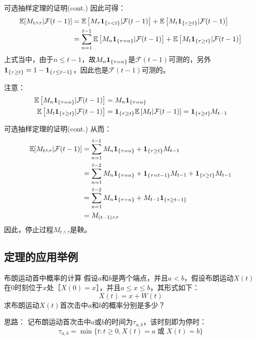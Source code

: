 \documentclass[t]{beamer}
\newcommand{\E}{\mathbb{E}}
\begin{document}
       \begin{frame}{可选抽样定理的证明(cont.)}
        因此可得：
        \[\begin{split}
        \E[M_{t\wedge \tau}|\mathcal{F}(t-1)]&=\E\left[M_{\tau}{\bf 1}_{\{\tau<t\}}|\mathcal{F}(t-1)\right]+\E\left[M_{t}{\bf 1}_{\{\tau\ge t\}}|\mathcal{F}(t-1)\right]\\
        &=\sum^{t-1}_{n=1}\E\left[M_{n} {\bf 1}_{\{\tau=n\}} |\mathcal{F}(t-1)\right] + \E\left[M_{t}{\bf 1}_{\{\tau\ge t\}}|\mathcal{F}(t-1)\right]
        \end{split} \]
        上式当中，由于$n\le t-1$，故$M_{n} {\bf 1}_{\{\tau=n\}}$是$\mathcal{F}(t-1)$可测的，另外${\bf 1}_{\{\tau\ge t\}}=1-{\bf 1}_{\{\tau\le t-1\}}$，因此也是$\mathcal{F}(t-1)$可测的。
        \begin{block}{注意：}
          \[\begin{split}
            \E\left[M_{n} {\bf 1}_{\{\tau=n\}} |\mathcal{F}(t-1)\right]&=M_{n}{\bf 1}_{\{\tau=n\}}\\
          \E\left[M_{t}{\bf 1}_{\{\tau\ge t\}}|\mathcal{F}(t-1)\right]&={\bf 1}_{\{\tau\ge t\}}\E\left[M_{t}|\mathcal{F}(t-1)\right] ={\bf 1}_{\{\tau\ge t\}}M_{t-1}
          \end{split}\]
        \end{block}
      \end{frame}

      \begin{frame}{可选抽样定理的证明(cont.)}
        从而：
        \[\begin{split}
        \E[M_{t\wedge \tau}|\mathcal{F}(t-1)]
        &=\sum^{t-1}_{n=1}M_{n}{\bf 1}_{\{\tau=n\}}+{\bf 1}_{\{\tau\ge t\}}M_{t-1}\\
        &=\sum^{t-2}_{n=1}M_{n}{\bf 1}_{\{\tau=n\}}+{\bf 1}_{\{\tau= t-1\}}M_{t-1}+{\bf 1}_{\{\tau\ge t\}}M_{t-1}\\
        &=\sum^{t-2}_{n=1}M_{n}{\bf 1}_{\{\tau=n\}}+M_{t-1}{\bf 1}_{\{\tau\ge t-1\}}\\
        &=M_{(t-1)\wedge \tau}
        \end{split} \]
        因此，停止过程$M_{t\wedge \tau}$是鞅。      
      \end{frame}

      \subsection{定理的应用举例}
      \begin{frame}{布朗运动首中概率的计算}
        假设$a$和$b$是两个端点，并且$a<b$，假设布朗运动$X(t)$在0时刻位于$x$处［$X(0)=x$］，并且$a\le x\le b$，其形式如下：
\[X(t)=x+W(t) \]
求布朗运动$X(t)$首次击中$a$和$b$的概率分别是多少？

\begin{block}{思路：}
  记布朗运动首次击中$a$或$b$的时间为$\tau_{a,b}$，该时刻即为停时：
\begin{equation*}
\tau_{a,b}=\min\big\{t:t\ge 0, X(t)=a \;\text{或}\; X(t)=b \big\}
\end{equation*}
\end{block}
      \end{frame}
\end{document}
